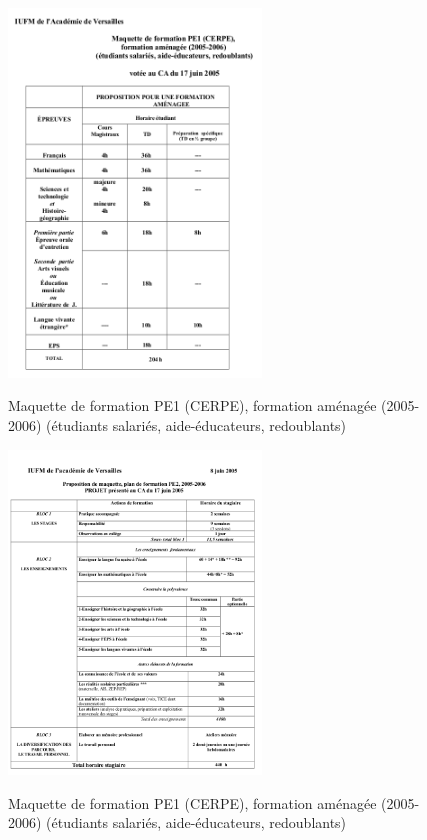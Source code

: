 \documentclass[a4paper,11pt]{article}
\begin{document}
			  \begin{figure}[!h]
			    \centering
			    \includegraphics[width=0.6\textwidth]{prog2005.png}\\
			    \caption{Maquette de formation PE1 (CERPE), formation aménagée (2005-2006) (étudiants salariés, aide-éducateurs, redoublants)}
			    \label{fig. 2}
			  \end{figure}
			  
			  \begin{figure}[!h]
			    \centering
			    \includegraphics[width=0.6\textwidth]{prog05PE2.png}\\
			    \caption{Maquette de formation PE1 (CERPE), formation aménagée (2005-2006) (étudiants salariés, aide-éducateurs, redoublants)}
			    \label{fig. 3}
			  \end{figure}
			
\end{document}
